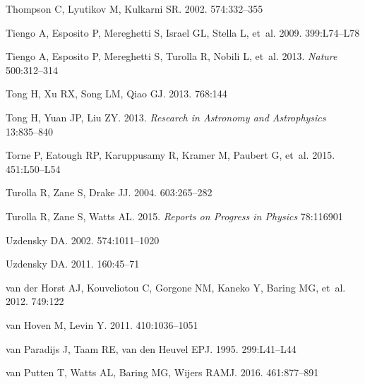 \documentclass[letterpaper]{ar-1col}
\begin{document}
\begin{thebibliography}{}
Thompson C, Lyutikov M, Kulkarni SR. 2002.
\textit{\apj} 574:332--355

{Tiengo} A, {Esposito} P, {Mereghetti} S, {Israel} GL, {Stella} L, et~al. 2009.
\textit{\mnras} 399:L74--L78

{Tiengo} A, {Esposito} P, {Mereghetti} S, {Turolla} R, {Nobili} L, et~al. 2013.
\textit{Nature} 500:312--314

{Tong} H, {Xu} RX, {Song} LM, {Qiao} GJ. 2013.
\textit{\apj} 768:144

{Tong} H, {Yuan} JP, {Liu} ZY. 2013.
\textit{Research in Astronomy and Astrophysics} 13:835--840

{Torne} P, {Eatough} RP, {Karuppusamy} R, {Kramer} M, {Paubert} G, et~al. 2015.
\textit{\mnras} 451:L50--L54

{Turolla} R, {Zane} S, {Drake} JJ. 2004.
\textit{\apj} 603:265--282

{Turolla} R, {Zane} S, {Watts} AL. 2015.
\textit{Reports on Progress in Physics} 78:116901

{Uzdensky} DA. 2002.
\textit{\apj} 574:1011--1020

{Uzdensky} DA. 2011.
\textit{\ssr} 160:45--71

{van der Horst} AJ, {Kouveliotou} C, {Gorgone} NM, {Kaneko} Y, {Baring} MG,
  et~al. 2012.
\textit{\apj} 749:122

{van Hoven} M, {Levin} Y. 2011.
\textit{\mnras} 410:1036--1051

{van Paradijs} J, Taam RE, {van den Heuvel} EPJ. 1995.
\textit{\aap} 299:L41--L44

{van Putten} T, {Watts} AL, {Baring} MG, {Wijers} RAMJ. 2016.
\textit{\mnras} 461:877--891


\end{thebibliography}
\end{document}
